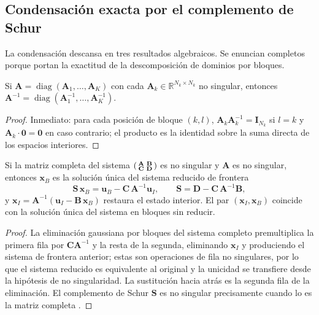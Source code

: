 \subsection{Condensación exacta por el complemento de Schur}
\label{sub:schur}

La condensación descansa en tres resultados algebraicos. Se enuncian completos porque portan la exactitud de la descomposición de dominios por bloques.

\begin{lemma}
\label{lem:blockdiag}
Si $\mathbf{A} = \operatorname{diag}(\mathbf{A}_1, \dots, \mathbf{A}_K)$ con cada $\mathbf{A}_k \in \mathbb{R}^{N_k \times N_k}$ no singular, entonces $\mathbf{A}^{-1} = \operatorname{diag}(\mathbf{A}_1^{-1}, \dots, \mathbf{A}_K^{-1})$.
\end{lemma}
\begin{proof}
Inmediato: para cada posición de bloque $(k, l)$, $\mathbf{A}_k \mathbf{A}_k^{-1} = \mathbf{I}_{N_k}$ si $l = k$ y $\mathbf{A}_k \cdot \mathbf{0} = \mathbf{0}$ en caso contrario; el producto es la identidad sobre la suma directa de los espacios interiores.
\end{proof}

\begin{theorem}
\label{thm:schur}
Si la matriz completa del sistema $\begin{psmallmatrix} \mathbf{A} & \mathbf{B} \\ \mathbf{C} & \mathbf{D} \end{psmallmatrix}$ es no singular y $\mathbf{A}$ es no singular, entonces $\mathbf{x}_B$ es la solución única del sistema reducido de frontera
\begin{equation}
\mathbf{S}\, \mathbf{x}_B = \mathbf{u}_B - \mathbf{C}\, \mathbf{A}^{-1} \mathbf{u}_I, \qquad \mathbf{S} = \mathbf{D} - \mathbf{C}\, \mathbf{A}^{-1} \mathbf{B},
\label{eq:schur}
\end{equation}
y $\mathbf{x}_I = \mathbf{A}^{-1}(\mathbf{u}_I - \mathbf{B}\, \mathbf{x}_B)$ restaura el estado interior. El par $(\mathbf{x}_I, \mathbf{x}_B)$ coincide con la solución única del sistema en bloques sin reducir.
\end{theorem}
\begin{proof}
La eliminación gaussiana por bloques del sistema completo premultiplica la primera fila por $\mathbf{C}\mathbf{A}^{-1}$ y la resta de la segunda, eliminando $\mathbf{x}_I$ y produciendo el sistema de frontera anterior; estas son operaciones de fila no singulares, por lo que el sistema reducido es equivalente al original y la unicidad se transfiere desde la hipótesis de no singularidad. La sustitución hacia atrás es la segunda fila de la eliminación. El complemento de Schur $\mathbf{S}$ es no singular precisamente cuando lo es la matriz completa \cite{zhang2005}.
\end{proof}

